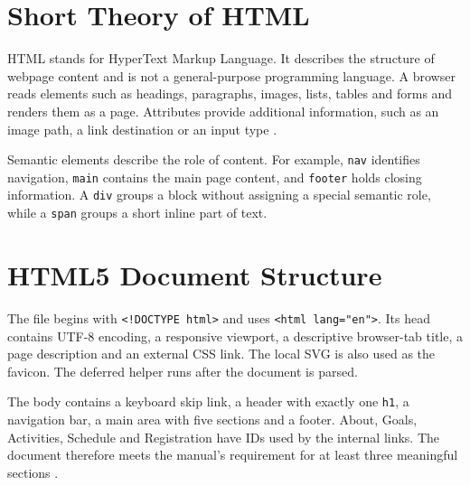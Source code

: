 \documentclass[11pt,a4paper]{article}
\begin{document}
\section{Short Theory of HTML}
HTML stands for HyperText Markup Language. It describes the structure of webpage content and is not a general-purpose programming language. A browser reads elements such as headings, paragraphs, images, lists, tables and forms and renders them as a page. Attributes provide additional information, such as an image path, a link destination or an input type \cite{manual}.

Semantic elements describe the role of content. For example, \texttt{nav} identifies navigation, \texttt{main} contains the main page content, and \texttt{footer} holds closing information. A \texttt{div} groups a block without assigning a special semantic role, while a \texttt{span} groups a short inline part of text.
\section{HTML5 Document Structure}
The file begins with \texttt{<!DOCTYPE html>} and uses \texttt{<html lang="en">}. Its head contains UTF-8 encoding, a responsive viewport, a descriptive browser-tab title, a page description and an external CSS link. The local SVG is also used as the favicon. The deferred helper runs after the document is parsed.

The body contains a keyboard skip link, a header with exactly one \texttt{h1}, a navigation bar, a main area with five sections and a footer. About, Goals, Activities, Schedule and Registration have IDs used by the internal links. The document therefore meets the manual's requirement for at least three meaningful sections \cite{manual}.

\clearpage
\end{document}
